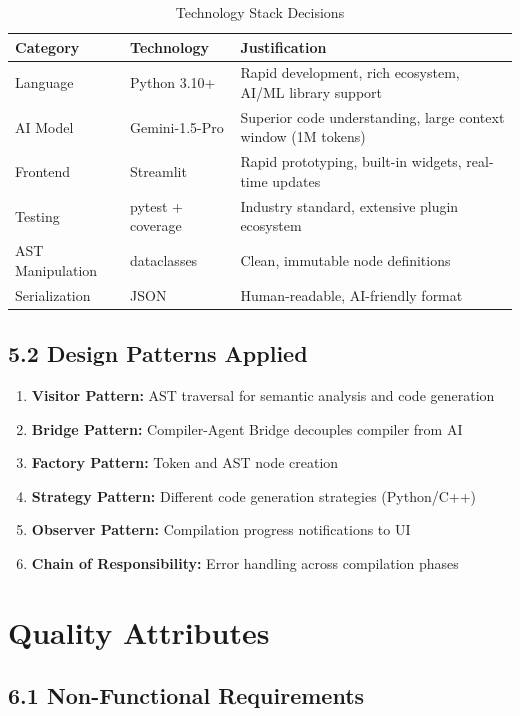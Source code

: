 \documentclass[a4paper,11pt]{article}
\begin{document}
\begin{table}[h]
\centering
\begin{tabularx}{\textwidth}{|l|l|X|}
\hline
\rowcolor{blue!10}
\textbf{Category} & \textbf{Technology} & \textbf{Justification} \\
\hline
Language & Python 3.10+ & Rapid development, rich ecosystem, AI/ML library support \\
\hline
AI Model & Gemini-1.5-Pro & Superior code understanding, large context window (1M tokens) \\
\hline
Frontend & Streamlit & Rapid prototyping, built-in widgets, real-time updates \\
\hline
Testing & pytest + coverage & Industry standard, extensive plugin ecosystem \\
\hline
AST Manipulation & dataclasses & Clean, immutable node definitions \\
\hline
Serialization & JSON & Human-readable, AI-friendly format \\
\hline
\end{tabularx}
\caption{Technology Stack Decisions}
\end{table}

\subsection{5.2 Design Patterns Applied}

\begin{enumerate}
    \item \textbf{Visitor Pattern:} AST traversal for semantic analysis and code generation
    \item \textbf{Bridge Pattern:} Compiler-Agent Bridge decouples compiler from AI
    \item \textbf{Factory Pattern:} Token and AST node creation
    \item \textbf{Strategy Pattern:} Different code generation strategies (Python/C++)
    \item \textbf{Observer Pattern:} Compilation progress notifications to UI
    \item \textbf{Chain of Responsibility:} Error handling across compilation phases
\end{enumerate}

\section{Quality Attributes}

\subsection{6.1 Non-Functional Requirements}
\end{document}
